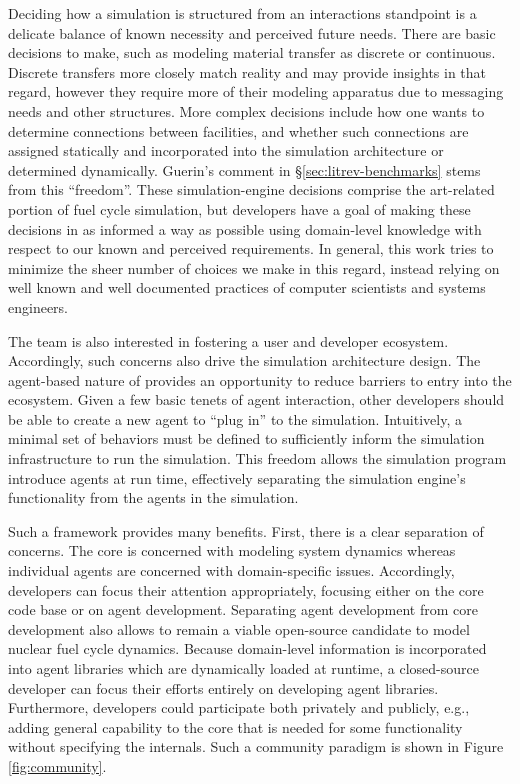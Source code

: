 Deciding how a simulation is structured from an interactions standpoint is a
delicate balance of known necessity and perceived future needs. There are basic
decisions to make, such as modeling material transfer as discrete or
continuous. Discrete transfers more closely match reality and may provide
insights in that regard, however they require more of their modeling apparatus
due to messaging needs and other structures. More complex decisions include how
one wants to determine connections between facilities, and whether such
connections are assigned statically and incorporated into the simulation
architecture or determined dynamically. Guerin's comment
in \S\ref{sec:litrev-benchmarks} stems from this ``freedom''. These
simulation-engine decisions comprise the art-related portion of fuel cycle
simulation, but developers have a goal of making these decisions in as informed
a way as possible using domain-level knowledge with respect to our known and
perceived requirements. In general, this work tries to minimize the sheer number
of choices we make in this regard, instead relying on well known and well
documented practices of computer scientists and systems engineers.

The \Cyclus team is also interested in fostering a user and developer ecosystem.
Accordingly, such concerns also drive the simulation architecture design. The
agent-based nature of \Cyclus provides an opportunity to reduce barriers to
entry into the ecosystem. Given a few basic tenets of agent interaction, other
developers should be able to create a new agent to ``plug in'' to the
simulation. Intuitively, a minimal set of behaviors must be defined to
sufficiently inform the simulation infrastructure to run the simulation. This
freedom allows the simulation program introduce agents at run time, effectively
separating the simulation engine's functionality from the agents in the
simulation.

Such a framework provides many benefits. First, there is a clear separation of
concerns. The \Cyclus core is concerned with modeling system dynamics whereas
individual agents are concerned with domain-specific issues. Accordingly,
developers can focus their attention appropriately, focusing either on the core
code base or on agent development. Separating agent development from core
development also allows \Cyclus to remain a viable open-source candidate to
model nuclear fuel cycle dynamics. Because domain-level information is
incorporated into agent libraries which are dynamically loaded at runtime, a
closed-source developer can focus their efforts entirely on developing agent
libraries. Furthermore, developers could participate both privately and
publicly, e.g., adding general capability to the \Cyclus core that is needed for
some functionality without specifying the internals. Such a community paradigm
is shown in Figure \ref{fig:community}.

